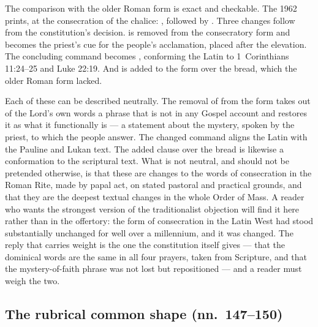 The comparison with the older Roman form is exact and checkable. The 1962  prints, at the consecration of the chalice: , followed by .
Three changes follow from the constitution's decision.  is removed from
the consecratory form and becomes the priest's cue for the people's acclamation, placed after
the elevation. The concluding command becomes ,
conforming the Latin to 1~Corinthians 11:24--25 and Luke 22:19. And  is added to the form over the bread, which the older Roman form lacked.

Each of these can be described neutrally. The removal of  from the form
takes out of the Lord's own words a phrase that is not in any Gospel account and restores it as
what it functionally is --- a statement about the mystery, spoken by the priest, to which the
people answer. The changed command aligns the Latin with the Pauline and Lukan text. The added
clause over the bread is likewise a conformation to the scriptural text. What is not neutral,
and should not be pretended otherwise, is that these are changes to the words of consecration
in the Roman Rite, made by papal act, on stated pastoral and practical grounds, and that they
are the deepest textual changes in the whole Order of Mass. A reader who wants the strongest
version of the traditionalist objection will find it here rather than in the offertory: the
form of consecration in the Latin West had stood substantially unchanged for well over a
millennium, and it was changed. The reply that carries weight is the one the constitution
itself gives --- that the dominical words are the same in all four prayers, taken from
Scripture, and that the mystery-of-faith phrase was not lost but repositioned --- and a reader
must weigh the two.

\subsection{The rubrical common shape (nn.\ 147--150)}

